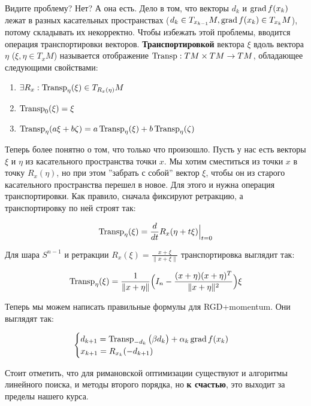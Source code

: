 \noindent
Видите проблему? Нет? А она есть. Дело в том, что векторы $d_k$ и $\operatorname{grad} f(x_k)$ лежат в разных касательных пространствах ($d_k \in T_{x_{k-1}} M, \operatorname{grad} f(x_k) \in T_{x_k} M$), потому складывать их некорректно. Чтобы избежать этой проблемы, вводится операция транспортировки векторов. \textbf{Транспортировкой} вектора $\xi$ вдоль вектора $\eta$ ($\xi, \eta \in T_x M$) называется отображение $\operatorname{Transp}: TM \times TM \rightarrow TM$, обладающее следующими свойствами:

\begin{enumerate}
    \item $\exists R_x: \operatorname{Transp}_\eta (\xi) \in T_{R_x(\eta)} M$
    \item $\operatorname{Transp}_0 (\xi) = \xi$
    \item $\operatorname{Transp}_\eta (a \xi + b \zeta) = a\operatorname{Transp}_\eta (\xi) + b\operatorname{Transp}_\eta (\zeta)$
\end{enumerate}

Теперь более понятно о том, что только что произошло. Пусть у нас есть векторы $\xi$ и $\eta$ из касательного пространства точки $x$. Мы хотим сместиться из точки $x$ в точку $R_x (\eta)$, но при этом ''забрать с собой'' вектор $\xi$, чтобы он из старого касательного пространства перешел в новое. Для этого и нужна операция транспортировки. Как правило, сначала фиксируют ретракцию, а транспортировку по ней строят так:

$$
\operatorname{Transp}_\eta (\xi) = \frac{d}{dt} R_x (\eta + t\xi) \Big|_{t=0}
$$

\noindent
Для шара $S^{n-1}$ и ретракции $R_x (\xi) = \frac{x + \xi}{\|x + \xi\|}$ транспортировка выглядит так:

$$
\operatorname{Transp}_\eta (\xi) = \frac{1}{\|x+\eta\|} \Big(I_n - \frac{(x+\eta)(x+\eta)^T}{\|x+\eta\|^2} \Big) \xi
$$

Теперь мы можем написать правильные формулы для RGD+momentum. Они выглядят так:

$$
\begin{cases}
    d_{k+1} = \operatorname{Transp}_{-d_k} \big( \beta d_k \big) + \alpha_k \operatorname{grad} f(x_k) \\
    x_{k+1} = R_{x_k} (-d_{k+1})
\end{cases}
$$

\noindent
Стоит отметить, что для римановской оптимизации существуют и алгоритмы линейного поиска, и методы второго порядка, но \textbf{к счастью}, это выходит за пределы нашего курса.
